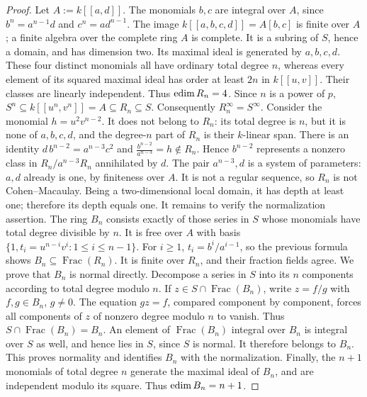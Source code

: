 \documentclass[11pt,a4paper]{amsart}
\numberwithin{equation}{section}
\begin{document}
 \begin{proof}
 Let  $A:=k[[a,d]]$.	The monomials $b,c$ are integral over $A$, since
$b^n=a^{n-1}d$ and $ c^n=ad^{n-1}.$	The image $k[[a,b,c,d]]=A[b,c]$ is finite over $A$;	a finite algebra over the complete ring $A$ is complete. 	It is a subring of $S$, hence a domain, and has dimension two. 	Its maximal ideal is generated by $a,b,c,d$. 	These four distinct monomials all have ordinary total degree $n$, 	whereas every element of its squared maximal ideal has order at 	least $2n$ in $k[[u,v]]$. Their classes are linearly independent. 	Thus $\operatorname{edim} R_n=4$.
 	 	Since $n$ is a power of $p$,
$	S^n\subseteq k[[u^n,v^n]]=A\subseteq R_n\subseteq S. $	Consequently $R_n^\infty=S^\infty$.
 	Consider the monomial
$	h=u^2v^{n-2}.$	It does not belong to $R_n$: its total degree is $n$, but it is
none of $a,b,c,d$, and the degree-$n$ part of $R_n$ is their
$k$-linear span.
 There is an identity
$	d\,b^{n-2}=a^{n-3}c^2$ and
 $	\frac{b^{n-2}}{a^{n-3}}=h\notin R_n.	$
Hence $b^{n-2}$ represents a nonzero class in
$R_n/a^{n-3}R_n$ annihilated by $d$. 	The pair $a^{n-3},d$ is a system of parameters: $a,d$ already 	is one, by finiteness over $A$. 	It is not a regular sequence, so $R_n$ is not Cohen--Macaulay.	Being a two-dimensional local domain, it has depth at least one; 	therefore its depth equals one.	It remains to verify the normalization assertion. 	The ring $B_n$ consists exactly of those series in $S$ whose 	monomials have total degree divisible by $n$. It is free over $A$ 	with basis  $\{1, t_i=u^{n-i}v^i:1\leq i\leq n-1 \}.	$ 	For $i\geq1$, $t_i=b^i/a^{i-1}$, so the previous formula shows	$B_n\subseteq\operatorname{Frac}(R_n)$. 	It is finite over $R_n$, and their fraction fields agree. 	We prove that $B_n$ is normal directly. 	Decompose a series in $S$ into its $n$ components according 	to total degree modulo $n$. 	If $z\in S\cap\operatorname{Frac}(B_n)$, write $z=f/g$	with $f,g\in B_n$, $g\neq0$. 	The equation $gz=f$, compared component by component, forces	all components of $z$ of nonzero degree modulo $n$ to vanish.	Thus
 $	S\cap\operatorname{Frac}(B_n)=B_n.	$	An element of $\operatorname{Frac}(B_n)$ integral over $B_n$	is integral over $S$ as well, and hence lies in $S$, since	$S$ is normal. It therefore belongs to $B_n$. 	This proves normality and identifies $B_n$ with the normalization.
Finally, the $n+1$ monomials of total degree $n$ generate the	maximal ideal of $B_n$, and are independent modulo its square. 	Thus $\operatorname{edim} B_n=n+1$.
 \end{proof}
 
\end{document}
